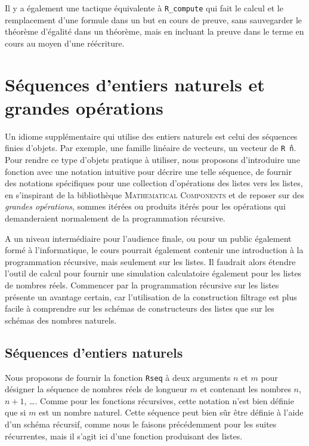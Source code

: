 \documentclass[draft]{jflart}
\newcommand{\mathcomp}{\textsc{Mathematical Components}}
\begin{document}
Il y a également une tactique équivalente à \texttt{R\_compute} qui fait
le calcul et le remplacement d'une formule dans un but en cours de
preuve, sans sauvegarder le théorème d'égalité dans un théorème, mais
en incluant la preuve dans le terme en cours au moyen d'une réécriture.

\section{Séquences d'entiers naturels et grandes opérations}
Un idiome supplémentaire qui utilise des entiers naturels est celui
des séquences finies d'objets.  Par exemple, une famille linéaire de
vecteurs, un vecteur de \texttt{R \^ n}.  Pour rendre ce type d'objets
pratique à utiliser, nous proposons d'introduire une fonction avec
une notation intuitive pour décrire une telle séquence, de fournir
des notations spécifiques pour une collection d'opérations des listes
vers les listes, en s'inspirant de la bibliothèque \mathcomp{}
\cite{MahboubiTass2022} et
de reposer sur des {\em grandes opérations}, sommes itérées ou
produits itérés pour les opérations qui demanderaient normalement de
la programmation récursive.

A un niveau intermédiaire pour l'audience finale, ou pour un public
également formé à l'informatique, le cours pourrait également contenir
une introduction à la programmation récursive, mais seulement sur les
listes.  Il faudrait alors étendre l'outil de calcul pour fournir une
simulation calculatoire également pour les listes de nombres réels.
Commencer par la programmation récursive sur les listes présente un
avantage certain, car l'utilisation de la construction filtrage est
plus facile à comprendre sur les schémas de constructeurs des listes
que sur les schémas des nombres naturels.

\subsection{Séquences d'entiers naturels}
Nous proposons de fournir la fonction \texttt{Rseq} à deux arguments
\(n\) et \(m\)
pour désigner la séquence de nombres réels de longueur \(m\) et
contenant les nombres \(n\), \(n + 1\), \dots.
Comme pour les fonctions récursives, cette notation
n'est bien définie que si \(m\) est un nombre naturel.  Cette séquence
peut bien sûr être définie à l'aide d'un schéma récursif, comme nous le
faisons précédemment pour les suites récurrentes, mais il s'agit ici
d'une fonction produisant des listes.
\end{document}
